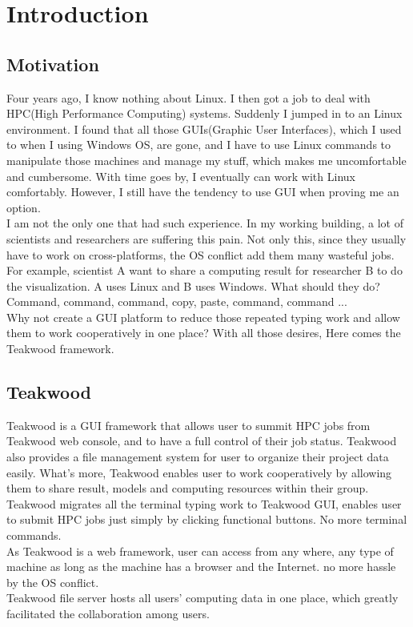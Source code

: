 \chapter{Introduction}

\section{Motivation}
Four years ago, I know nothing about Linux. I then got a job to deal with HPC(High Performance Computing) systems. Suddenly I jumped in to an Linux environment. I found that all those GUIs(Graphic User Interfaces), which I used to when I using Windows OS, are gone, and I have to use Linux commands to manipulate those machines and manage my stuff, which makes me uncomfortable and cumbersome. With time goes by, I eventually can work with Linux comfortably. However, I still have the tendency to use GUI when proving me an option.\\I am not the only one that had such experience. In my working building, a lot of scientists and researchers are suffering this pain. Not only this, since they usually have to work on cross-platforms, the OS conflict add them many wasteful jobs. For example, scientist A want to share a computing result for researcher B to do the visualization. A uses Linux and B uses Windows. What should they do? Command, command, command, copy, paste, command, command ...\\Why not create a GUI platform to reduce those repeated typing work and allow them to work cooperatively in one place? With all those desires, Here comes the Teakwood framework.

\section{Teakwood}
Teakwood is a GUI framework that allows user to summit HPC jobs from Teakwood web console, and to have a full control of their job status. Teakwood also provides a file management system for user to organize their project data easily. What's more, Teakwood enables user to work cooperatively by allowing them to share result, models and computing resources within their group. \\
Teakwood migrates all the terminal typing work to Teakwood GUI, enables user to submit HPC jobs just simply by clicking functional buttons. No more terminal commands.\\
As Teakwood is a web framework, user can access from any where, any type of machine as long as the machine has a browser and the Internet. no more hassle by the OS conflict.\\
Teakwood file server hosts all users' computing data in one place, which greatly facilitated the collaboration among users.

